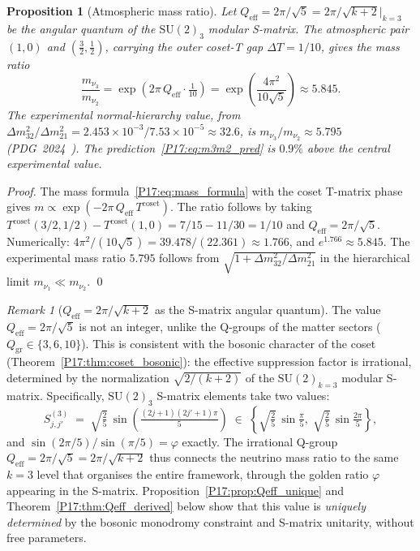 \documentclass[11pt,a4paper]{article}
\newtheorem{proposition}[theorem]{Proposition}
\theoremstyle{definition}\newtheorem{definition}[theorem]{Definition}
\theoremstyle{remark}
\newtheorem{remark}[theorem]{Remark}
\newcommand{\vp}{\varphi}
\newcommand{\SU}{\mathrm{SU}}
\begin{document}
\begin{proposition}[Atmospheric mass ratio]
\label{P17:prop:nu_mass_ratio}
Let $Q_{\mathrm{eff}}=2\pi/\sqrt{5}=2\pi/\sqrt{k+2}\big|_{k=3}$ be
the angular quantum of the $\SU(2)_3$ modular S-matrix.  The atmospheric
pair $(1,0)$ and $(\frac{3}{2},\frac{1}{2})$, carrying the outer
coset-T gap $\Delta T=1/10$, gives the mass ratio
\begin{equation}
  \frac{m_{\nu_3}}{m_{\nu_2}}
  = \exp\!\left(2\pi\,Q_{\mathrm{eff}}\cdot\tfrac{1}{10}\right)
  = \exp\!\left(\frac{4\pi^2}{10\sqrt{5}}\right)
  \approx 5.845.
  \label{P17:eq:m3m2_pred}
\end{equation}
The experimental normal-hierarchy value, from
$\Delta m^2_{32}/\Delta m^2_{21}=2.453\times10^{-3}/7.53\times10^{-5}\approx32.6$,
is $m_{\nu_3}/m_{\nu_2}\approx5.795$ (PDG~2024~\cite{PDG2024}).  The
prediction~\eqref{P17:eq:m3m2_pred} is $0.9\%$ above the central
experimental value.
\end{proposition}

\begin{proof}
The mass formula~\eqref{P17:eq:mass_formula} with the coset T-matrix
phase gives $m\propto\exp(-2\pi\,Q_{\mathrm{eff}}\,T^{\mathrm{coset}})$.
The ratio follows by taking $T^{\mathrm{coset}}(3/2,1/2)-T^{\mathrm{coset}}(1,0)
=7/15-11/30=1/10$ and $Q_{\mathrm{eff}}=2\pi/\sqrt{5}$.  Numerically:
$4\pi^2/(10\sqrt{5})=39.478/(22.361)\approx1.766$, and
$e^{1.766}\approx5.845$.  The experimental mass ratio $5.795$ follows
from $\sqrt{1+\Delta m^2_{32}/\Delta m^2_{21}}$ in the hierarchical
limit $m_{\nu_1}\ll m_{\nu_2}$.
\qed
\end{proof}

\begin{remark}[$Q_{\mathrm{eff}}=2\pi/\sqrt{k+2}$ as the S-matrix
angular quantum]
\label{P17:rem:Qeff_origin}
The value $Q_{\mathrm{eff}}=2\pi/\sqrt{5}$ is not an integer, unlike
the Q-groups of the matter sectors ($Q_{\mathrm{gr}}\in\{3,6,10\}$).
This is consistent with the bosonic character of the coset
(Theorem~\ref{P17:thm:coset_bosonic}): the effective suppression factor
is irrational, determined by the normalization $\sqrt{2/(k+2)}$
of the $\SU(2)_{k=3}$ modular S-matrix.  Specifically,
$\SU(2)_3$ S-matrix elements take two values:
\[
  S_{j,j'}^{(3)} \;=\; \sqrt{\tfrac{2}{5}}\,\sin\!\left(
    \tfrac{(2j+1)(2j'+1)\pi}{5}\right)
  \;\in\;
  \left\{\sqrt{\tfrac{2}{5}}\,\sin\tfrac{\pi}{5},\;
         \sqrt{\tfrac{2}{5}}\,\sin\tfrac{2\pi}{5}\right\},
\]
and $\sin(2\pi/5)/\sin(\pi/5)=\vp$ exactly.  The irrational
Q-group $Q_{\mathrm{eff}}=2\pi/\sqrt{5}=2\pi/\sqrt{k+2}$ thus
connects the neutrino mass ratio to the same $k=3$ level that
organises the entire framework, through the golden ratio $\vp$
appearing in the S-matrix.  Proposition~\ref{P17:prop:Qeff_unique} and
Theorem~\ref{P17:thm:Qeff_derived} below show that this value is
\emph{uniquely determined} by the bosonic monodromy constraint and
S-matrix unitarity, without free parameters.
\end{remark}
\end{document}
